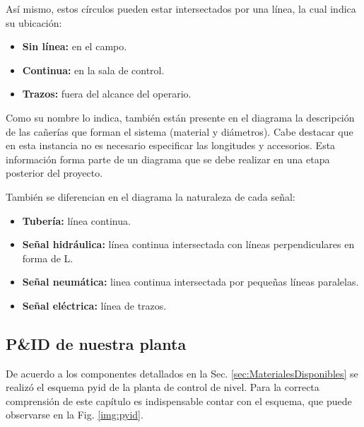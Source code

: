 Así mismo, estos círculos pueden estar intersectados por una línea, la
cual
indica su ubicación:

\begin{itemize}
 \item \textbf{Sin línea:} en el campo.
 \item \textbf{Continua:} en la sala de control.
 \item \textbf{Trazos:} fuera del alcance del operario.
\end{itemize}

Como su nombre lo indica, también están presente en el diagrama la descripción
de las cañerías que forman el sistema (material y diámetros).
Cabe destacar que en esta instancia no es necesario especificar las
longitudes y accesorios.
Esta información forma parte de un diagrama que se debe realizar
en una etapa posterior del proyecto.

También se diferencian en el diagrama la naturaleza de cada señal:

\begin{itemize}
 \item \textbf{Tubería:} línea continua.
 \item \textbf{Señal hidráulica:} línea continua intersectada con líneas
perpendiculares en forma de L.
 \item \textbf{Señal neumática:} linea continua intersectada por pequeñas
líneas paralelas.
 \item \textbf{Señal eléctrica:} línea de trazos.
\end{itemize}

\subsection{P\&ID de nuestra planta}
De acuerdo a los componentes detallados en la Sec.
\ref{sec:MaterialesDisponibles} se realizó el esquema \gls{pyid} de la planta
de control de nivel.
Para la correcta comprensión de este capítulo es indispensable contar con el
esquema, que puede observarse en la Fig. \ref{img:pyid}.

